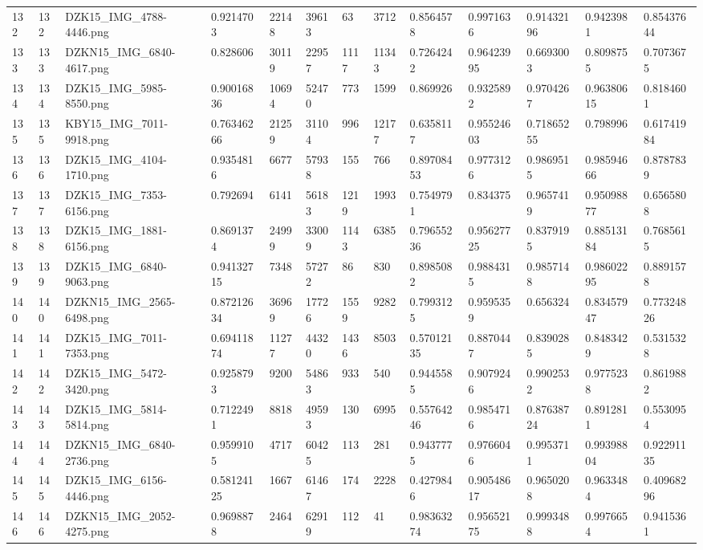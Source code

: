 \documentclass[11pt, a4paper, twoside]{report}
\begin{document}
\begin{longtable}[c]{@{}lllllllllllll@{}}
132 & 132 & DZK15\_IMG\_4788-4446.png & 0.9214703 & 22148 & 39613 & 63 & 3712 & 0.8564578 & 0.9971636 & 0.91432196 & 0.9423981 & 0.85437644 \\
133 & 133 & DZKN15\_IMG\_6840-4617.png & 0.828606 & 30119 & 22957 & 1117 & 11343 & 0.7264242 & 0.96423995 & 0.6693003 & 0.8098755 & 0.7073675 \\
134 & 134 & DZK15\_IMG\_5985-8550.png & 0.90016836 & 10694 & 52470 & 773 & 1599 & 0.869926 & 0.9325892 & 0.9704267 & 0.96380615 & 0.8184601 \\
135 & 135 & KBY15\_IMG\_7011-9918.png & 0.76346266 & 21259 & 31104 & 996 & 12177 & 0.6358117 & 0.95524603 & 0.71865255 & 0.798996 & 0.61741984 \\
136 & 136 & DZK15\_IMG\_4104-1710.png & 0.9354816 & 6677 & 57938 & 155 & 766 & 0.89708453 & 0.9773126 & 0.9869515 & 0.98594666 & 0.8787839 \\
137 & 137 & DZK15\_IMG\_7353-6156.png & 0.792694 & 6141 & 56183 & 1219 & 1993 & 0.7549791 & 0.834375 & 0.9657419 & 0.95098877 & 0.6565808 \\
138 & 138 & DZK15\_IMG\_1881-6156.png & 0.8691374 & 24999 & 33009 & 1143 & 6385 & 0.79655236 & 0.95627725 & 0.8379195 & 0.88513184 & 0.7685615 \\
139 & 139 & DZK15\_IMG\_6840-9063.png & 0.94132715 & 7348 & 57272 & 86 & 830 & 0.8985082 & 0.9884315 & 0.9857148 & 0.98602295 & 0.8891578 \\
140 & 140 & DZKN15\_IMG\_2565-6498.png & 0.87212634 & 36969 & 17726 & 1559 & 9282 & 0.7993125 & 0.9595359 & 0.656324 & 0.83457947 & 0.77324826 \\
141 & 141 & DZK15\_IMG\_7011-7353.png & 0.69411874 & 11277 & 44320 & 1436 & 8503 & 0.57012135 & 0.8870447 & 0.8390285 & 0.8483429 & 0.5315328 \\
142 & 142 & DZK15\_IMG\_5472-3420.png & 0.9258793 & 9200 & 54863 & 933 & 540 & 0.9445585 & 0.9079246 & 0.9902532 & 0.9775238 & 0.8619882 \\
143 & 143 & DZK15\_IMG\_5814-5814.png & 0.7122491 & 8818 & 49593 & 130 & 6995 & 0.55764246 & 0.9854716 & 0.87638724 & 0.8912811 & 0.5530954 \\
144 & 144 & DZKN15\_IMG\_6840-2736.png & 0.9599105 & 4717 & 60425 & 113 & 281 & 0.9437775 & 0.9766046 & 0.9953711 & 0.99398804 & 0.92291135 \\
145 & 145 & DZK15\_IMG\_6156-4446.png & 0.58124125 & 1667 & 61467 & 174 & 2228 & 0.4279846 & 0.90548617 & 0.9650208 & 0.9633484 & 0.40968296 \\
146 & 146 & DZKN15\_IMG\_2052-4275.png & 0.9698878 & 2464 & 62919 & 112 & 41 & 0.98363274 & 0.95652175 & 0.9993488 & 0.9976654 & 0.9415361 \\

\end{longtable}
\end{document}
